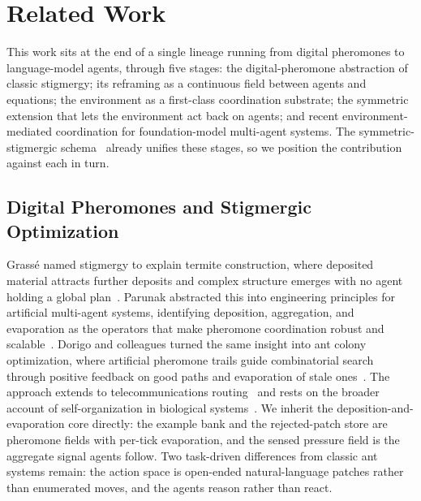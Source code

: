 
\section{Related Work}
\label{sec:related-work}

This work sits at the end of a single lineage running from digital pheromones to language-model agents, through five stages: the digital-pheromone abstraction of classic stigmergy; its reframing as a continuous field between agents and equations; the environment as a first-class coordination substrate; the symmetric extension that lets the environment act back on agents; and recent environment-mediated coordination for foundation-model multi-agent systems. The symmetric-stigmergic schema~\cite{parunak2025insects} already unifies these stages, so we position the contribution against each in turn.

\subsection{Digital Pheromones and Stigmergic Optimization}

Grass\'{e} named stigmergy to explain termite construction, where deposited material attracts further deposits and complex structure emerges with no agent holding a global plan~\cite{grasse1959stigmergie}. Parunak abstracted this into engineering principles for artificial multi-agent systems, identifying deposition, aggregation, and evaporation as the operators that make pheromone coordination robust and scalable~\cite{parunak1997ant}. Dorigo and colleagues turned the same insight into ant colony optimization, where artificial pheromone trails guide combinatorial search through positive feedback on good paths and evaporation of stale ones~\cite{dorigo1996ant,dorigo1997acs,dorigo2004acobook}. The approach extends to telecommunications routing~\cite{bonabeau1998iata} and rests on the broader account of self-organization in biological systems~\cite{camazine2001selforg}. We inherit the deposition-and-evaporation core directly: the example bank and the rejected-patch store are pheromone fields with per-tick evaporation, and the sensed pressure field is the aggregate signal agents follow. Two task-driven differences from classic ant systems remain: the action space is open-ended natural-language patches rather than enumerated moves, and the agents reason rather than react.

